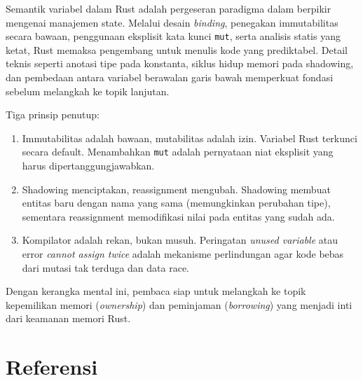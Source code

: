 \documentclass[11pt,a4paper]{article}
\begin{document}
Semantik variabel dalam Rust adalah pergeseran paradigma dalam berpikir mengenai manajemen state. Melalui desain \textit{binding}, penegakan immutabilitas secara bawaan, penggunaan eksplisit kata kunci \texttt{mut}, serta analisis statis yang ketat, Rust memaksa pengembang untuk menulis kode yang prediktabel. Detail teknis seperti anotasi tipe pada konstanta, siklus hidup memori pada shadowing, dan pembedaan antara variabel berawalan garis bawah memperkuat fondasi sebelum melangkah ke topik lanjutan.

Tiga prinsip penutup:

\begin{enumerate}
	\item Immutabilitas adalah bawaan, mutabilitas adalah izin. Variabel Rust terkunci secara default. Menambahkan \texttt{mut} adalah pernyataan niat eksplisit yang harus dipertanggungjawabkan.
	\item Shadowing menciptakan, reassignment mengubah. Shadowing membuat entitas baru dengan nama yang sama (memungkinkan perubahan tipe), sementara reassignment memodifikasi nilai pada entitas yang sudah ada.
	\item Kompilator adalah rekan, bukan musuh. Peringatan \textit{unused variable} atau error \textit{cannot assign twice} adalah mekanisme perlindungan agar kode bebas dari mutasi tak terduga dan data race.
\end{enumerate}

Dengan kerangka mental ini, pembaca siap untuk melangkah ke topik kepemilikan memori (\textit{ownership}) dan peminjaman (\textit{borrowing}) yang menjadi inti dari keamanan memori Rust.

\newpage
\section*{Referensi}
\end{document}

